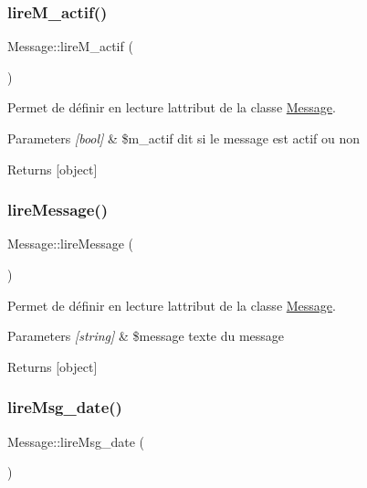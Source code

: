 \subsubsection{\texorpdfstring{lire\+M\+\_\+actif()}{lireM\_actif()}}
{\footnotesize\ttfamily Message\+::lire\+M\+\_\+actif (\begin{DoxyParamCaption}{ }\end{DoxyParamCaption})}



Permet de définir en lecture l\textquotesingle{}attribut de la classe \hyperlink{class_message}{Message}. 


\begin{DoxyParams}{Parameters}
{\em \mbox{[}bool\mbox{]}} & \$m\+\_\+actif dit si le message est actif ou non \\
\hline
\end{DoxyParams}
\begin{DoxyReturn}{Returns}
\mbox{[}object\mbox{]} 
\end{DoxyReturn}
\mbox{\label{class_message_a5e7093a4928f769ae1cea698165ec5cd}} 
\subsubsection{\texorpdfstring{lire\+Message()}{lireMessage()}}
{\footnotesize\ttfamily Message\+::lire\+Message (\begin{DoxyParamCaption}{ }\end{DoxyParamCaption})}



Permet de définir en lecture l\textquotesingle{}attribut de la classe \hyperlink{class_message}{Message}. 


\begin{DoxyParams}{Parameters}
{\em \mbox{[}string\mbox{]}} & \$message texte du message \\
\hline
\end{DoxyParams}
\begin{DoxyReturn}{Returns}
\mbox{[}object\mbox{]} 
\end{DoxyReturn}
\mbox{\label{class_message_ae8c85c209076411201029393c04831e6}} 
\subsubsection{\texorpdfstring{lire\+Msg\+\_\+date()}{lireMsg\_date()}}
{\footnotesize\ttfamily Message\+::lire\+Msg\+\_\+date (\begin{DoxyParamCaption}{ }\end{DoxyParamCaption})}



